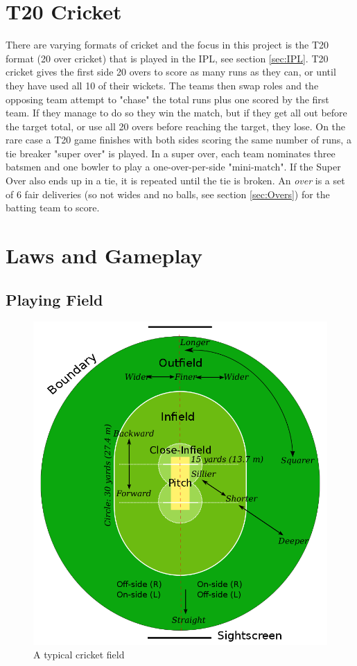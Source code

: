 \documentclass[12pt,a4paper]{report}
\theoremstyle{definition}
\begin{document}
\section{T20 Cricket} \label{sec:T20Cricket}

There are varying formats of cricket and the focus in this project is the T20 format (20 over cricket) that is played in the IPL, see section \ref{sec:IPL}. 
T20 cricket gives the first side 20 overs to score as many runs as they can, or until they have used all 10 of their wickets.
The teams then swap roles and the opposing team attempt to "chase" the total runs plus one scored by the first team. 
If they manage to do so they win the match, but if they get all out before the target total, or use all 20 overs before reaching the target, they lose.
On the rare case a T20 game finishes with both sides scoring the same number of runs, a tie breaker "super over" is played.
In a super over, each team nominates three batsmen and one bowler to play a one-over-per-side "mini-match".
If the Super Over also ends up in a tie, it is repeated until the tie is broken.
An \emph{over} is a set of 6 fair deliveries (so not wides and no balls, see section \ref{sec:Overs}) for the batting team to score.

\section{Laws and Gameplay}

\subsection{Playing Field}

\begin{figure}[H]
    \centering
    \includegraphics[width=0.8\linewidth]{Cricket_Field.png}
    \caption{A typical cricket field \citep{cricketWiki}}
    \label{fig:CricketField}
\end{figure}
\end{document}
